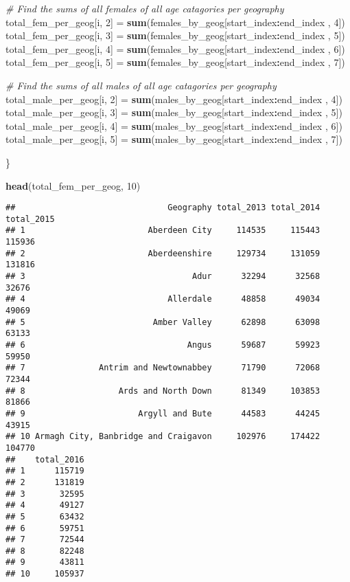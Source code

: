 \documentclass[]{article}
\newenvironment{Shaded}{\begin{snugshade}}{\end{snugshade}}
\newcommand{\KeywordTok}[1]{\textcolor[rgb]{0.13,0.29,0.53}{\textbf{#1}}}
\newcommand{\DecValTok}[1]{\textcolor[rgb]{0.00,0.00,0.81}{#1}}
\newcommand{\StringTok}[1]{\textcolor[rgb]{0.31,0.60,0.02}{#1}}
\newcommand{\CommentTok}[1]{\textcolor[rgb]{0.56,0.35,0.01}{\textit{#1}}}
\newcommand{\OperatorTok}[1]{\textcolor[rgb]{0.81,0.36,0.00}{\textbf{#1}}}
\newcommand{\NormalTok}[1]{#1}
\begin{document}
\begin{Shaded}
\begin{Highlighting}[]
    \CommentTok{# Find the sums of all females of all age catagories per geography}
\NormalTok{    total_fem_per_geog[i, }\DecValTok{2}\NormalTok{] =}\StringTok{ }\KeywordTok{sum}\NormalTok{(females_by_geog[start_index}\OperatorTok{:}\NormalTok{end_index , }\DecValTok{4}\NormalTok{])}
\NormalTok{    total_fem_per_geog[i, }\DecValTok{3}\NormalTok{] =}\StringTok{ }\KeywordTok{sum}\NormalTok{(females_by_geog[start_index}\OperatorTok{:}\NormalTok{end_index , }\DecValTok{5}\NormalTok{])}
\NormalTok{    total_fem_per_geog[i, }\DecValTok{4}\NormalTok{] =}\StringTok{ }\KeywordTok{sum}\NormalTok{(females_by_geog[start_index}\OperatorTok{:}\NormalTok{end_index , }\DecValTok{6}\NormalTok{])}
\NormalTok{    total_fem_per_geog[i, }\DecValTok{5}\NormalTok{] =}\StringTok{ }\KeywordTok{sum}\NormalTok{(females_by_geog[start_index}\OperatorTok{:}\NormalTok{end_index , }\DecValTok{7}\NormalTok{])}
    
    \CommentTok{# Find the sums of all males of all age catagories per geography}
\NormalTok{    total_male_per_geog[i, }\DecValTok{2}\NormalTok{] =}\StringTok{ }\KeywordTok{sum}\NormalTok{(males_by_geog[start_index}\OperatorTok{:}\NormalTok{end_index , }\DecValTok{4}\NormalTok{])}
\NormalTok{    total_male_per_geog[i, }\DecValTok{3}\NormalTok{] =}\StringTok{ }\KeywordTok{sum}\NormalTok{(males_by_geog[start_index}\OperatorTok{:}\NormalTok{end_index , }\DecValTok{5}\NormalTok{])}
\NormalTok{    total_male_per_geog[i, }\DecValTok{4}\NormalTok{] =}\StringTok{ }\KeywordTok{sum}\NormalTok{(males_by_geog[start_index}\OperatorTok{:}\NormalTok{end_index , }\DecValTok{6}\NormalTok{])}
\NormalTok{    total_male_per_geog[i, }\DecValTok{5}\NormalTok{] =}\StringTok{ }\KeywordTok{sum}\NormalTok{(males_by_geog[start_index}\OperatorTok{:}\NormalTok{end_index , }\DecValTok{7}\NormalTok{])}
    
\NormalTok{\}}

\KeywordTok{head}\NormalTok{(total_fem_per_geog, }\DecValTok{10}\NormalTok{)}
\end{Highlighting}
\end{Shaded}

\begin{verbatim}
##                               Geography total_2013 total_2014 total_2015
## 1                         Aberdeen City     114535     115443     115936
## 2                         Aberdeenshire     129734     131059     131816
## 3                                  Adur      32294      32568      32676
## 4                             Allerdale      48858      49034      49069
## 5                          Amber Valley      62898      63098      63133
## 6                                 Angus      59687      59923      59950
## 7               Antrim and Newtownabbey      71790      72068      72344
## 8                   Ards and North Down      81349     103853      81866
## 9                       Argyll and Bute      44583      44245      43915
## 10 Armagh City, Banbridge and Craigavon     102976     174422     104770
##    total_2016
## 1      115719
## 2      131819
## 3       32595
## 4       49127
## 5       63432
## 6       59751
## 7       72544
## 8       82248
## 9       43811
## 10     105937
\end{verbatim}
\end{document}
